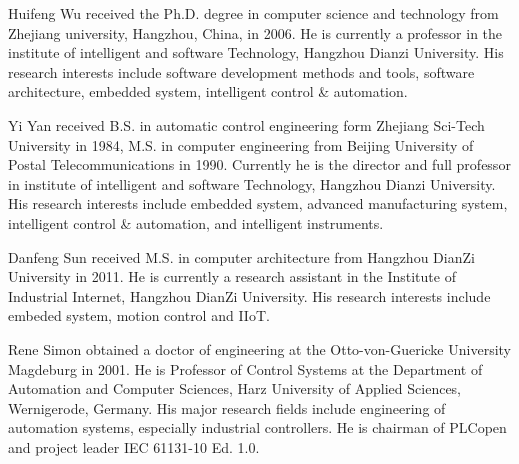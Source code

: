 \documentclass[journal]{IEEEtran}
\begin{document}



%

\begin{IEEEbiography}{Huifeng Wu} received the Ph.D. degree in computer science and technology from Zhejiang university, Hangzhou, China, in 2006. He is currently a professor in the institute of intelligent and software Technology, Hangzhou Dianzi University. His research interests include software development methods and tools, software architecture, embedded system, intelligent control \& automation.
	
\end{IEEEbiography}
\begin{IEEEbiography}{Yi Yan} received B.S. in automatic control engineering form Zhejiang Sci-Tech University in 1984, M.S. in computer engineering from Beijing University of Postal Telecommunications in 1990. Currently he is the director and full professor in institute of intelligent and software Technology, Hangzhou Dianzi University. His research interests include embedded system, advanced manufacturing system, intelligent control \& automation, and intelligent instruments.
	
	
\end{IEEEbiography}
\begin{IEEEbiography}{Danfeng Sun} received M.S. in computer architecture from Hangzhou DianZi University in 2011. He is currently a research assistant in the Institute of Industrial Internet, Hangzhou DianZi University. His research interests include embeded system, motion control and IIoT.
\end{IEEEbiography}
\begin{IEEEbiography}{Rene Simon} obtained a doctor of engineering at the Otto-von-Guericke University Magdeburg in 2001. He is Professor of Control Systems at the Department of Automation and Computer Sciences, Harz University of Applied Sciences, Wernigerode, Germany. His major research fields include engineering of automation systems, especially industrial controllers. He is chairman of PLCopen and project leader IEC 61131-10 Ed. 1.0.
\end{IEEEbiography}
\end{document}
